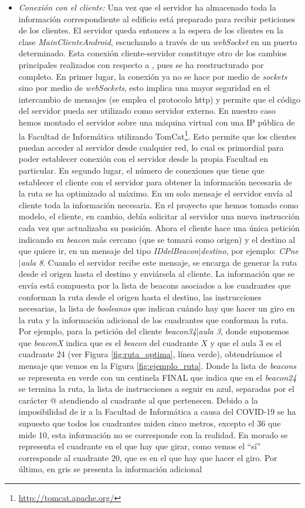 \begin{itemize}
	\item \textit{Conexión con el cliente:} Una vez que el servidor ha almacenado toda la información correspondiente al edificio está preparado para recibir peticiones de los clientes. El servidor queda entonces a la espera de los clientes en la clase \textit{MainClienteAndroid}, escuchando a través de un \textit{webSocket} en un puerto determinado. Esta conexión cliente-servidor constituye otro de los cambios principales realizados con respecto a \cite{TFGguia}, pues se ha reestructurado por completo. En primer lugar, la conexión ya no se hace por medio de \textit{sockets} sino por medio de \textit{webSockets}, esto implica una mayor seguridad en el intercambio de mensajes (se emplea el protocolo http) y permite que el código del servidor pueda ser utilizado como servidor externo. En nuestro caso hemos montado el servidor sobre una máquina virtual con una IP pública de la Facultad de Informática utilizando TomCat\footnote{\url{http://tomcat.apache.org/}}. Esto permite que los clientes puedan acceder al servidor desde cualquier red, lo cual es primordial para poder establecer conexión con el servidor desde la propia Facultad en particular. En segundo lugar, el número de conexiones que tiene que establecer el cliente con el servidor para obtener la información necesaria de la ruta se ha optimizado al máximo. En un solo mensaje el servidor envía al cliente toda la información necesaria. En el proyecto que hemos tomado como modelo, el cliente, en cambio, debía solicitar al servidor una nueva instrucción cada vez que actualizaba su posición. Ahora el cliente hace una única petición indicando su \textit{beacon} más cercano (que se tomará como origen) y el destino al que quiere ir, en un mensaje del tipo \textit{IDdelBeacon$|$destino}, por ejemplo: \textit{CPne$|$aula 8}.	Cuando el servidor recibe este mensaje, se encarga de generar la ruta desde el origen hasta el destino y enviársela al cliente. La información que se envía está compuesta por la lista de beacons asociados a los cuadrantes que conforman la ruta desde el origen hasta el destino, las instrucciones necesarias, la lista de \textit{booleanos} que indican cuándo hay que hacer un giro en la ruta y la información adicional de los cuadrantes que conforman la ruta. Por ejemplo, para la petición del cliente \textit{beacon34$|$aula 3}, donde suponemos que \textit{beaconX} indica que es el \textit{beacon} del cuadrante $X$ y que el aula 3 es el cuadrante 24 (ver Figura \ref{fig:ruta_optima}, línea verde), obtendríamos el mensaje que vemos en la Figura \ref{fig:ejemplo_ruta}. Donde la lista de \textit{beacons} se representa en verde con un centinela FINAL que indica que en el \textit{beacon24} se termina la ruta, la lista de instrucciones a seguir en azul, separadas por el carácter @ atendiendo al cuadrante al que pertenecen. Debido a la imposibilidad de ir a la Facultad de Informática a causa del COVID-19 se ha supuesto que todos los cuadrantes miden cinco metros, excepto el $36$ que mide 10, esta información no se corresponde con la realidad. En morado se representa el cuadrante en el que hay que girar, como vemos el ``sí'' corresponde al cuadrante $20$, que es en el que hay que hacer el giro. Por último, en gris se presenta la información adicional 
\end{itemize}
